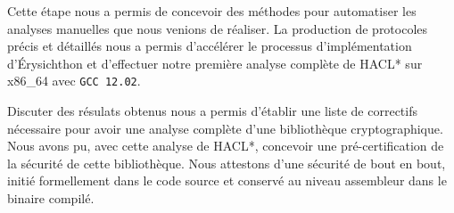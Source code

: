 Cette étape nous a permis de concevoir des méthodes pour automatiser les analyses manuelles que nous venions de réaliser. La production de protocoles précis et détaillés nous a permis d'accélérer le processus d'implémentation d'Érysichthon et d'effectuer notre première analyse complète de HACL* sur x86\_64 avec \texttt{GCC 12.02}.\smallbreak

Discuter des résulats obtenus nous a permis d'établir une liste de correctifs nécessaire pour avoir une analyse complète d'une bibliothèque cryptographique. Nous avons pu, avec cette analyse de HACL*, concevoir une pré-certification de la sécurité de cette bibliothèque. Nous attestons d'une sécurité de bout en bout, initié formellement dans le code source et conservé au niveau assembleur dans le binaire compilé. 



